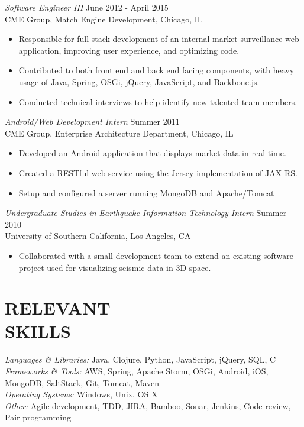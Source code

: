 \documentclass[margin]{res}
\begin{document}
\begin{resume}
                {\sl Software Engineer III} \hfill June 2012 - April 2015 \\
                CME Group, Match Engine Development, Chicago, IL
                 \begin{itemize}  \itemsep -2pt %
                 \item Responsible for full-stack development of an internal market surveillance web application, improving user experience, and optimizing code.
                 \item Contributed to both front end and back end facing components, with heavy usage of Java, Spring, OSGi, jQuery, JavaScript, and Backbone.js.
                 \item Conducted technical interviews to help identify new talented team members.
                \end{itemize}

                {\sl Android/Web Development Intern} \hfill            Summer 2011 \\
                CME Group, Enterprise Architecture Department, Chicago, IL
                 \begin{itemize}  \itemsep -2pt %
                 \item Developed an Android application that displays market data in real time.
                 \item Created a RESTful web service using the Jersey implementation of JAX-RS.
                 \item Setup and configured a server running MongoDB and Apache/Tomcat
                 \end{itemize}

                {\sl Undergraduate Studies in Earthquake Information Technology Intern} \hfill        Summer 2010 \\
                University of Southern California, Los Angeles, CA
                 \begin{itemize} \itemsep -2pt
                  \item Collaborated with a small development team to extend an existing software project used for visualizing seismic data in 3D space.
                  \end{itemize}

\section{RELEVANT \\ SKILLS}
{\sl Languages \& Libraries:} Java, Clojure, Python, JavaScript, jQuery, SQL, C \\
{\sl Frameworks \& Tools:} AWS, Spring, Apache Storm, OSGi, Android, iOS, MongoDB, SaltStack, Git, Tomcat, Maven \\
{\sl Operating Systems:} Windows, Unix, OS X \\
{\sl Other:} Agile development, TDD, JIRA, Bamboo, Sonar, Jenkins, Code review, Pair programming


\end{resume}
\end{document}
